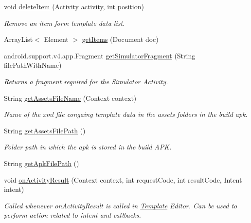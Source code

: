 \begin{DoxyCompactItemize}
void \hyperlink{interfaceorg_1_1buildmlearn_1_1toolkit_1_1model_1_1TemplateInterface_acc9339e97daba180a70b5d1907f214df}{delete\+Item} (Activity activity, int position)
\begin{DoxyCompactList}\small\item\em Remove an item form template data list. \end{DoxyCompactList}\item 
Array\+List$<$ Element $>$ \hyperlink{interfaceorg_1_1buildmlearn_1_1toolkit_1_1model_1_1TemplateInterface_a9fb6e277f0ebfb2caea138017854473f}{get\+Items} (Document doc)
\item 
android.\+support.\+v4.\+app.\+Fragment \hyperlink{interfaceorg_1_1buildmlearn_1_1toolkit_1_1model_1_1TemplateInterface_a8668cc58306c48c8581ae51393138649}{get\+Simulator\+Fragment} (String file\+Path\+With\+Name)
\begin{DoxyCompactList}\small\item\em Returns a fragment required for the Simulator Activity. \end{DoxyCompactList}\item 
String \hyperlink{interfaceorg_1_1buildmlearn_1_1toolkit_1_1model_1_1TemplateInterface_aab9ccfcee9b83ea3d70efffecf8dad78}{get\+Assets\+File\+Name} (Context context)
\begin{DoxyCompactList}\small\item\em Name of the xml file congaing template data in the assets folders in the build apk. \end{DoxyCompactList}\item 
String \hyperlink{interfaceorg_1_1buildmlearn_1_1toolkit_1_1model_1_1TemplateInterface_ae35d1ab3f2c88b79d0d2a79cde81155b}{get\+Assets\+File\+Path} ()
\begin{DoxyCompactList}\small\item\em Folder path in which the apk is stored in the build A\+PK. \end{DoxyCompactList}\item 
String \hyperlink{interfaceorg_1_1buildmlearn_1_1toolkit_1_1model_1_1TemplateInterface_a1bca348acb3790aebce645c04a9e0945}{get\+Apk\+File\+Path} ()
\item 
void \hyperlink{interfaceorg_1_1buildmlearn_1_1toolkit_1_1model_1_1TemplateInterface_a9c506bf3776973765d4d1e8d6954e95b}{on\+Activity\+Result} (Context context, int request\+Code, int result\+Code, Intent intent)
\begin{DoxyCompactList}\small\item\em Called whenever on\+Activity\+Result is called in \hyperlink{enumorg_1_1buildmlearn_1_1toolkit_1_1model_1_1Template}{Template} Editor. Can be used to perform action related to intent and callbacks. \end{DoxyCompactList}\end{DoxyCompactItemize}


